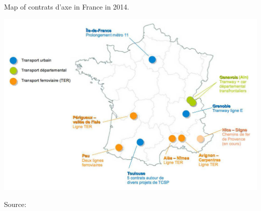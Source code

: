 \begin{refsegment}
    \begin{carte}[h!]\vspace*{4pt}
        \caption{Map of contrats d'axe in France in 2014.}
        \label{fig-chap1:carte-contrats-axe-france}
        \centerline{\includegraphics[width=0.75\columnwidth]{src/Figures/Chap-1/Carte_contrats_axe.jpg}}
        \vspace{5pt}
        \begin{flushright}\scriptsize{
        Source: \textcolor{blue}{\textcite[18]{bentayou_contrat_2015}}
        }\end{flushright}
    \end{carte}


\end{refsegment}
